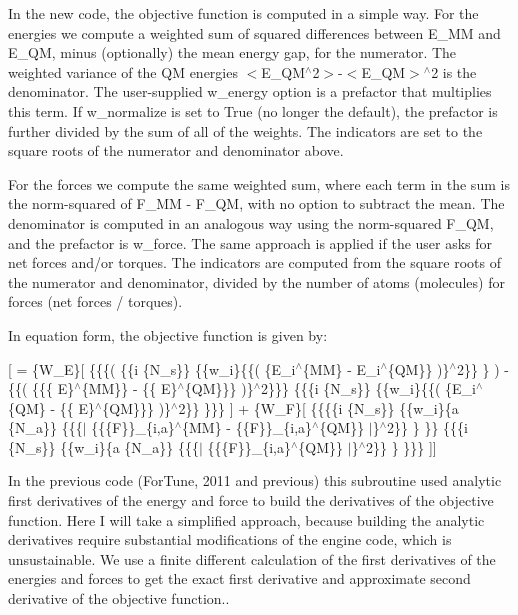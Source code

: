 In the new code, the objective function is computed in a simple way. For the energies we compute a weighted sum of squared differences between E\+\_\+\+MM and E\+\_\+\+QM, minus (optionally) the mean energy gap, for the numerator. The weighted variance of the QM energies $<$E\+\_\+\+Q\+M$^\wedge$2$>$-\/$<$\+E\+\_\+\+Q\+M$>$$^\wedge$2 is the denominator. The user-\/supplied w\+\_\+energy option is a prefactor that multiplies this term. If w\+\_\+normalize is set to True (no longer the default), the prefactor is further divided by the sum of all of the weights. The indicators are set to the square roots of the numerator and denominator above.

For the forces we compute the same weighted sum, where each term in the sum is the norm-\/squared of F\+\_\+\+MM -\/ F\+\_\+\+QM, with no option to subtract the mean. The denominator is computed in an analogous way using the norm-\/squared F\+\_\+\+QM, and the prefactor is w\+\_\+force. The same approach is applied if the user asks for net forces and/or torques. The indicators are computed from the square roots of the numerator and denominator, divided by the number of atoms (molecules) for forces (net forces / torques).

In equation form, the objective function is given by\+:

\mbox{[} = \{W\+\_\+E\}\mbox{[} \{\{\{( \{\{i  \{N\+\_\+s\}\} \{\{w\+\_\+i\}\{\{( \{E\+\_\+i$^\wedge$\{MM\} -\/ E\+\_\+i$^\wedge$\{QM\}\} )\}$^\wedge$2\}\} \} ) -\/ \{\{( \{\{\{ E\}$^\wedge$\{MM\}\} -\/ \{\{ E\}$^\wedge$\{QM\}\}\} )\}$^\wedge$2\}\}\} \{\{\{i  \{N\+\_\+s\}\} \{\{w\+\_\+i\}\{\{( \{E\+\_\+i$^\wedge$\{QM\} -\/ \{\{ E\}$^\wedge$\{QM\}\}\} )\}$^\wedge$2\}\} \}\}\} \mbox{]} + \{W\+\_\+F\}\mbox{[} \{\{\{\{i  \{N\+\_\+s\}\} \{\{w\+\_\+i\}\{a  \{N\+\_\+a\}\} \{\{\{$\vert$ \{\{\{F\}\}\+\_\+\{i,a\}$^\wedge$\{MM\} -\/ \{\{F\}\}\+\_\+\{i,a\}$^\wedge$\{QM\}\} $\vert$\}$^\wedge$2\}\} \} \}\} \{\{\{i  \{N\+\_\+s\}\} \{\{w\+\_\+i\}\{a  \{N\+\_\+a\}\} \{\{\{$\vert$ \{\{\{F\}\}\+\_\+\{i,a\}$^\wedge$\{QM\}\} $\vert$\}$^\wedge$2\}\} \} \}\}\} \mbox{]}\mbox{]}

In the previous code (For\+Tune, 2011 and previous) this subroutine used analytic first derivatives of the energy and force to build the derivatives of the objective function. Here I will take a simplified approach, because building the analytic derivatives require substantial modifications of the engine code, which is unsustainable. We use a finite different calculation of the first derivatives of the energies and forces to get the exact first derivative and approximate second derivative of the objective function..


